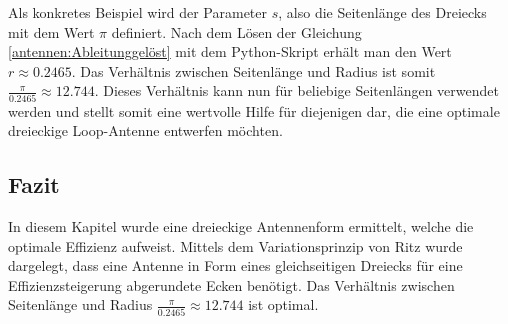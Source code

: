 Als konkretes Beispiel wird der Parameter $s$, also die Seitenlänge des Dreiecks mit dem Wert $\pi$ definiert. 
Nach dem Lösen der Gleichung \eqref{antennen:Ableitunggelöst} mit dem Python-Skript \cite{antennen:codeAbleitung} erhält
man den Wert $r\approx0.2465$. Das Verhältnis zwischen Seitenlänge und Radius ist somit $\frac{\pi}{0.2465} \approx 12.744$.
Dieses Verhältnis kann nun für beliebige Seitenlängen verwendet werden und stellt somit eine wertvolle Hilfe für 
diejenigen dar, die eine optimale dreieckige Loop-Antenne entwerfen möchten.

\subsection{Fazit\label{antennen:fazit}}
In diesem Kapitel wurde eine dreieckige Antennenform ermittelt, welche die optimale Effizienz aufweist. Mittels dem Variationsprinzip von Ritz wurde dargelegt, dass eine Antenne in Form eines gleichseitigen Dreiecks für eine Effizienzsteigerung abgerundete Ecken benötigt. Das Verhältnis zwischen Seitenlänge und Radius $\frac{\pi}{0.2465} \approx 12.744$ ist optimal.
